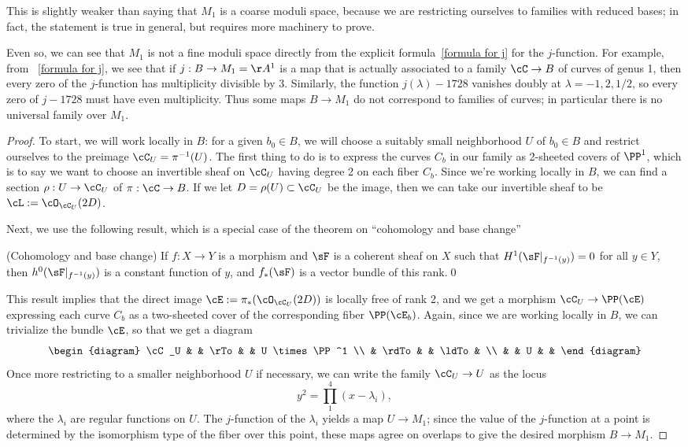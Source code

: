 This is slightly weaker than saying that $M_1$ is a coarse moduli space, because we are restricting ourselves to families with reduced bases; in fact, the statement is true in general, but requires more machinery to prove.

Even so, we can see that $M_1$ is not a fine moduli space directly from the explicit formula~\ref{formula for j} for the $j$-function. For example, from ~\ref{formula for j}, we see that if $j : B \to M_1 = \AA^1$ is a map that is actually associated to a family $\cC \to B$ of curves of genus 1, then every zero of the $j$-function has multiplicity divisible by 3.  Similarly, the function $j(\lambda)-1728$ vanishes doubly at $\lambda = -1, 2, 1/2$, so every zero of $j - 1728$ must have even multiplicity. Thus some maps $B\to M_1$ do not correspond to families of curves; in particular there is no universal family over $M_1$. 


\begin{proof}
To start, we will work locally in $B$: for a given $b_0 \in B$, we will choose a suitably small neighborhood $U$ of $b_0 \in B$ and restrict ourselves to the preimage $\cC_U = \pi^{-1}(U)$. The first thing to do is to express the curves $C_b$ in our family as 2-sheeted covers of $\PP^1$, which is to say we want to choose an invertible sheaf on $\cC_U$ having degree 2 on each fiber $C_b$. Since we're working locally in $B$,
we can find a section $\rho : U \to \cC_U$ of $\pi : \cC \to B$. If we let $D = \rho(U) \subset \cC_U$ be the image, then we can take our invertible sheaf to be $\cL := \cO_{\cC_U}(2D)$.

Next, we use the following result, which is a special case of the theorem on ``cohomology and base change''
\cite[****]{3264}
\begin{theorem}(Cohomology and base change) If $f: X\to Y$ is a morphism and $\sF$ is
a coherent sheaf on $X$ such that $H^{1}(\sF|_{f^{-1}(y)})= 0$ for all $y\in Y$, then 
$h^{0}(\sF|_{f^{-1}(y)})$ is a constant function of $y$, and 
$f_{*}(\sF)$ is a vector bundle of this rank.\qed
\end{theorem}

This result implies that the direct image $\cE := \pi_*(\cO_{\cC_U}(2D))$ is locally free of rank 2, and we get a morphism $\cC_U \to \PP(\cE)$ expressing each curve $C_b$ as a two-sheeted cover of the corresponding fiber $\PP(\cE_b)$. Again, since we are working locally in $B$, we can trivialize the bundle $\cE$, so that we get a diagram
$$
\begin{diagram}
\cC_U & & \rTo & & U \times \PP^1 \\
& \rdTo & & \ldTo & \\
& & U & &
\end{diagram} 
$$
Once more restricting to a smaller neighborhood $U$ if necessary, we can write the family $\cC_U \to U$ as the locus
$$
y^2 = \prod_1^4 (x - \lambda_i),
$$
where the $\lambda_i$ are regular functions on $U$. The $j$-function of the $\lambda_i$  yields a map $U \to M_1$; since the value of the $j$-function at a point is determined by the isomorphism type of the fiber over this point, these maps agree on overlaps to give  the desired morphism $B \to M_1$.
\end{proof}



